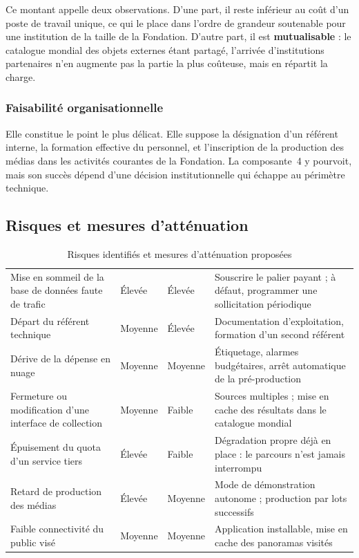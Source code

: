 Ce montant appelle deux observations. D'une part, il reste inférieur au coût
d'un poste de travail unique, ce qui le place dans l'ordre de grandeur
soutenable pour une institution de la taille de la Fondation. D'autre part, il
est \textbf{mutualisable} : le catalogue mondial des objets externes étant
partagé, l'arrivée d'institutions partenaires n'en augmente pas la partie la
plus coûteuse, mais en répartit la charge.

\subsubsection{Faisabilité organisationnelle}

Elle constitue le point le plus délicat. Elle suppose la désignation d'un
référent interne, la formation effective du personnel, et l'inscription de la
production des médias dans les activités courantes de la Fondation. La
composante~4 y pourvoit, mais son succès dépend d'une décision institutionnelle
qui échappe au périmètre technique.

\subsection{Risques et mesures d'atténuation}

\begin{table}[htbp]
\centering
\caption{Risques identifiés et mesures d'atténuation proposées}
\label{tab:risques}
\small
\begin{tabularx}{\textwidth}{|L{3.7cm}|C{2.1cm}|C{1.7cm}|X|}
\hline
{}
 &  &  &  \\ \hline
Mise en sommeil de la base de données faute de trafic & Élevée & Élevée & Souscrire le palier payant ; à défaut, programmer une sollicitation périodique \\ \hline
Départ du référent technique & Moyenne & Élevée & Documentation d'exploitation, formation d'un second référent \\ \hline
Dérive de la dépense en nuage & Moyenne & Moyenne & Étiquetage, alarmes budgétaires, arrêt automatique de la pré-production \\ \hline
Fermeture ou modification d'une interface de collection & Moyenne & Faible & Sources multiples ; mise en cache des résultats dans le catalogue mondial \\ \hline
Épuisement du quota d'un service tiers & Élevée & Faible & Dégradation propre déjà en place : le parcours n'est jamais interrompu \\ \hline
Retard de production des médias & Élevée & Moyenne & Mode de démonstration autonome ; production par lots successifs \\ \hline
Faible connectivité du public visé & Moyenne & Moyenne & Application installable, mise en cache des panoramas visités \\ \hline
\end{tabularx}
\end{table}


